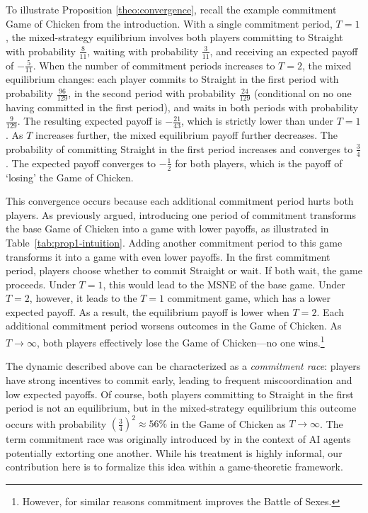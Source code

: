 \documentclass[../paper.tex]{subfiles}
\begin{document}
To illustrate Proposition \ref{theo:convergence}, recall the example commitment Game of Chicken from the introduction. With a single commitment period, $T = 1$, the mixed-strategy equilibrium involves both players committing to Straight with probability $\tfrac{8}{11}$, waiting with probability $\tfrac{3}{11}$, and receiving an expected payoff of $-\tfrac{5}{11}$. When the number of commitment periods increases to $T = 2$, the mixed equilibrium changes: each player commits to Straight in the first period with probability $\tfrac{96}{129}$, in the second period with probability $\tfrac{24}{129}$ (conditional on no one having committed in the first period), and waits in both periods with probability $\tfrac{9}{129}$. The resulting expected payoff is $-\tfrac{21}{43}$, which is strictly lower than under $T = 1$. As $T$ increases further, the mixed equilibrium payoff further decreases. The probability of committing Straight in the first period increases and converges to $\tfrac{3}{4}$. The expected payoff converges to $-\tfrac{1}{2}$ for both players, which is the payoff of `losing' the Game of Chicken.

This convergence occurs because each additional commitment period hurts both players. As previously argued, introducing one period of commitment transforms the base Game of Chicken into a game with lower payoffs, as illustrated in Table~\ref{tab:prop1-intuition}. Adding another commitment period to this game transforms it into a game with even lower payoffs. In the first commitment period, players choose whether to commit Straight or wait. If both wait, the game proceeds. Under $T = 1$, this would lead to the MSNE of the base game. Under $T = 2$, however, it leads to the $T = 1$ commitment game, which has a lower expected payoff. As a result, the equilibrium payoff is lower when $T=2$. Each additional commitment period worsens outcomes in the Game of Chicken. As $T\to\infty$, both players effectively lose the Game of Chicken—no one wins.\footnote{However, for similar reasons commitment improves the Battle of Sexes.}
 
The dynamic described above can be characterized as a \textit{commitment race}: players have strong incentives to commit early, leading to frequent miscoordination and low expected payoffs. Of course, both players committing to Straight in the first period is not an equilibrium, but in the mixed-strategy equilibrium this outcome occurs with probability $(\tfrac{3}{4})^2 \approx 56\%$ in the Game of Chicken as $T\to\infty$. The term commitment race was originally introduced by \textcite{kokotajlo_commitment_2019} in the context of AI agents potentially extorting one another. While his treatment is highly informal, our contribution here is to formalize this idea within a game-theoretic framework.
 
\end{document}
